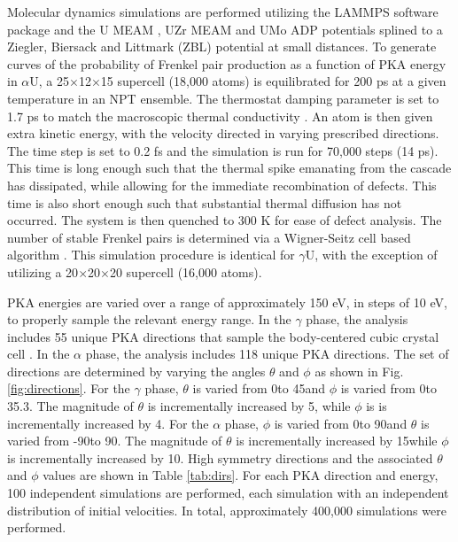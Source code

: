 \documentclass[review]{elsarticle}
\begin{document}
Molecular dynamics simulations are performed utilizing the LAMMPS \cite{plimpton1995} software package and the U MEAM \cite{beeler_meam}, UZr MEAM \cite{moore2015} and UMo ADP \cite{smirnovaADP} potentials splined to a Ziegler, Biersack and Littmark (ZBL) \cite{zbl} potential at small distances. To generate curves of the probability of Frenkel pair production as a function of PKA energy in $\alpha$U, a 25$\times$12$\times$15 supercell (18,000 atoms) is equilibrated for 200 ps at a given temperature in an NPT ensemble. The thermostat damping parameter is set to 1.7 ps to match the macroscopic thermal conductivity \cite{lane2012}. An atom is then given extra kinetic energy, with the velocity directed in varying prescribed directions. The time step is set to 0.2 fs and the simulation is run for 70,000 steps (14 ps). This time is long enough such that the thermal spike emanating from the cascade has dissipated, while allowing for the immediate recombination of defects. This time is also short enough such that substantial thermal diffusion has not occurred. The system is then quenched to 300 K for ease of defect analysis. The number of stable Frenkel pairs is determined via a Wigner-Seitz cell based algorithm \cite{hayward2010}. This simulation procedure is identical for $\gamma$U, with the exception of utilizing a 20$\times$20$\times$20 supercell (16,000 atoms). 

PKA energies are varied over a range of approximately 150 eV, in steps of 10 eV, to properly sample the relevant energy range. In the $\gamma$ phase, the analysis includes 55 unique PKA directions that sample the body-centered cubic crystal cell \cite{beeler2015}. In the $\alpha$ phase, the analysis includes 118 unique PKA directions. The set of directions are determined by varying the angles $\theta$ and $\phi$ as shown in Fig. \ref{fig:directions}. For the $\gamma$ phase, $\theta$ is varied from 0\degree to 45\degree and $\phi$ is varied from 0\degree to 35.3\degree. The magnitude of $\theta$ is incrementally increased by 5\degree, while $\phi$ is is incrementally increased by 4\degree. For the $\alpha$ phase, $\phi$ is varied from 0\degree to 90\degree and $\theta$ is varied from -90\degree to 90\degree. The magnitude of $\theta$ is incrementally increased by 15\degree  while $\phi$ is incrementally increased by 10\degree. High symmetry directions and the associated $\theta$ and $\phi$ values are shown in Table \ref{tab:dirs}. For each PKA direction and energy, 100 independent simulations are performed, each simulation with an independent distribution of initial velocities. In total, approximately 400,000 simulations were performed. 
\end{document}
